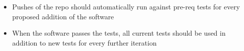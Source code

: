 
\begin{itemize}
\item Pushes of the repo should automatically run against pre-req tests for every proposed addition of the software
\item When the software passes the tests, all current tests should be used in addition to new tests for every further iteration
\end{itemize}


